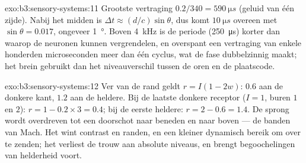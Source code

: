 \begin{solution}{exo:b3:sensory-systems:11}
Grootste vertraging $0.2/340 = \qty{590}{\micro s}$ (geluid van één
zijde). Nabij het midden is $\Delta t \approx (d/c)\sin\theta$, dus
komt $\qty{10}{\micro
s}$ overeen met $\sin\theta = 0.017$, ongeveer \qty{1}{\degree}. Boven
\qty{4}{kHz} is de periode (\qty{250}{\micro s}) korter dan waarop de
neuronen kunnen vergrendelen, en overspant een vertraging van enkele
honderden microseconden meer dan één cyclus, wat de fase dubbelzinnig
maakt; het brein gebruikt dan het niveauverschil tussen de oren en de
plaatscode.
\end{solution}

\begin{solution}{exo:b3:sensory-systems:12}
Ver van de rand geldt $r = I(1 - 2w)$: $0.6$ aan de donkere kant, $1.2$
aan de heldere. Bij de laatste donkere receptor ($I = 1$, buren $1$ en
$2$): $r
= 1 - 0.2\times 3 = 0.4$; bij de eerste heldere: $r = 2 - 0.6 = 1.4$.
De sprong wordt overdreven tot een doorschot naar beneden en naar boven
--- de banden van Mach. Het  wint contrast en randen, en een
kleiner dynamisch bereik om over te zenden; het verliest de trouw aan
absolute niveaus, en brengt begoochelingen van helderheid voort.
\end{solution}


